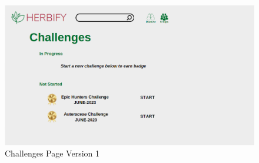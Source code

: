 \documentclass[conference]{IEEEtran}
\begin{document}
\begin{figure}[H]
\centerline{\includegraphics[width=0.48 \textwidth]{images/challengesv1.png}}
\caption{Challenges Page Version 1}
\label{fig:graph1}
\end{figure}









\end{document}
